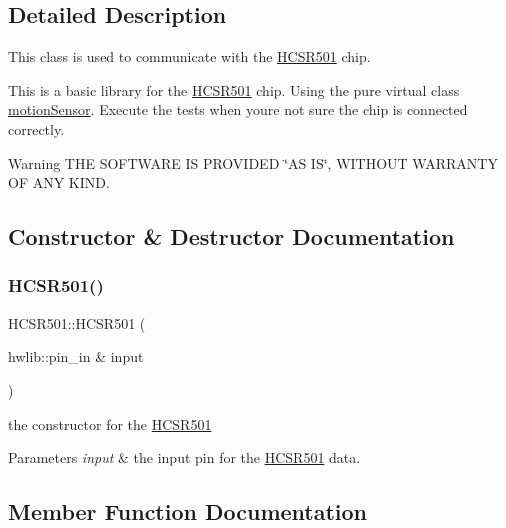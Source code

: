 \subsection{Detailed Description}
This class is used to communicate with the \mbox{\hyperlink{class_h_c_s_r501}{H\+C\+S\+R501}} chip. 

This is a basic library for the \mbox{\hyperlink{class_h_c_s_r501}{H\+C\+S\+R501}} chip. Using the pure virtual class \mbox{\hyperlink{classmotion_sensor}{motion\+Sensor}}. Execute the tests when you\textquotesingle{}re not sure the chip is connected correctly. \begin{DoxyWarning}{Warning}
T\+HE S\+O\+F\+T\+W\+A\+RE IS P\+R\+O\+V\+I\+D\+ED \char`\"{}\+A\+S I\+S\char`\"{}, W\+I\+T\+H\+O\+UT W\+A\+R\+R\+A\+N\+TY OF A\+NY K\+I\+ND. 
\end{DoxyWarning}


\subsection{Constructor \& Destructor Documentation}
\mbox{\label{class_h_c_s_r501_a589a13daf993e217138344db60086f36}} 
\subsubsection{\texorpdfstring{H\+C\+S\+R501()}{HCSR501()}}
{\footnotesize\ttfamily H\+C\+S\+R501\+::\+H\+C\+S\+R501 (\begin{DoxyParamCaption}\item[{hwlib\+::pin\+\_\+in \&}]{input }\end{DoxyParamCaption})}



the constructor for the \mbox{\hyperlink{class_h_c_s_r501}{H\+C\+S\+R501}} 


\begin{DoxyParams}{Parameters}
{\em input} & the input pin for the \mbox{\hyperlink{class_h_c_s_r501}{H\+C\+S\+R501}} data. \\
\hline
\end{DoxyParams}


\subsection{Member Function Documentation}
\mbox{\label{class_h_c_s_r501_a75456a573bf0066ee648f8f1a39d4966}} 
